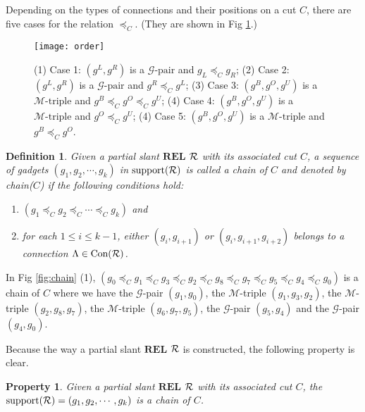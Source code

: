 \documentclass[11pt]{article}
\newcommand{\R}{{\cal R}}
\newcommand{\MM}{\mathcal{M}}
\newcommand{\GG}{\mathcal{G}}
\newcommand{\CON}{\mbox{Con}}
\newcommand{\REL}{\mathbf{REL}}
\newtheorem{definition}[figure]{Definition}
\newtheorem{property}[figure]{Property}
\begin{document}
Depending on the types of connections and their positions on a cut $C$,
there are five cases for the relation $\preceq_C$.
(They are shown in Fig \ref{fig:order}.)



\begin{figure}[t]
\begin{center}
\texttt{[image: order]}
  \centering
\caption{(1) Case 1: $(g^L, g^R)$ is a $\GG\mbox{-pair}$ and
$g_L\preceq_C g_R$;
(2) Case 2: $(g^L, g^R)$ is a $\GG\mbox{-pair}$ and
$g^R\preceq_C g^L$;
(3) Case 3: $(g^B, g^O, g^U)$ is a $\MM\mbox{-triple}$ and
$g^B \preceq_C g^O \preceq_C g^U$;
(4) Case 4: $(g^B, g^O, g^U)$ is a $\MM\mbox{-triple}$ and
$g^O \preceq_C g^U$;
(4) Case 5: $(g^B, g^O, g^U)$ is a $\MM\mbox{-triple}$ and
$g^B\preceq_C g^O$.}

\label{fig:order}
\end{center}
\end{figure}

\begin{definition}\label{def:chain}
Given a partial slant $\REL$ $\R$ with its associated cut $C$,
a sequence of gadgets $(g_1, g_2, \cdots, g_k)$ in $\mbox{support}(\R)$
is called a chain of $C$ and denoted by \emph{chain}($C$)
if the following conditions hold:
\begin{enumerate}
\item $(g_1\preceq_C g_2 \preceq_C \cdots \preceq_C g_k)$ and

\item for each $1\leq i\leq k-1$,
either $(g_i, g_{i+1})$ or $(g_i, g_{i+1}, g_{i+2})$ belongs to
a connection $\Lambda \in \CON(\R)$.
\end{enumerate}
\end{definition}

In Fig \ref{fig:chain} (1),
$(g_0 \preceq_C g_1 \preceq_C g_3 \preceq_C g_2 \preceq_C g_8 \preceq_C g_7 \preceq_C g_5 \preceq_C g_4 \preceq_C g_0)$
is a chain of $C$ where we have the $\GG$-pair $(g_1,g_0)$,
the $\MM$-triple $(g_1,g_3,g_2)$,
the $\MM$-triple $(g_2,g_8,g_7)$,
the $\MM$-triple $(g_6,g_7,g_5)$,
the $\GG$-pair $(g_5, g_4)$
and
the $\GG$-pair $(g_4, g_0)$.









Because the way a partial slant $\REL$ $\R$ is constructed,
the following property is clear.
\begin{property}\label{prop:chain}
Given a partial slant $\REL$ $\R$ with its associated cut $C$,
the $\mbox{support}(\R)=(g_1, g_2, \cdots, g_k)$
is a chain of $C$.
\end{property}
\end{document}
